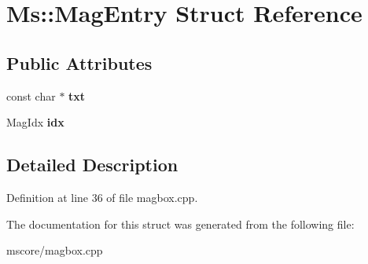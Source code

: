 \hypertarget{struct_ms_1_1_mag_entry}{}\section{Ms\+:\+:Mag\+Entry Struct Reference}
\label{struct_ms_1_1_mag_entry}
\subsection*{Public Attributes}
\begin{DoxyCompactItemize}
\item 
\mbox{\label{struct_ms_1_1_mag_entry_a7db5e2cd695adfa0621af0c840fbaaea}} 
const char $\ast$ {\bfseries txt}
\item 
\mbox{\label{struct_ms_1_1_mag_entry_a55c4d8b72feb78f20b3d7699d47878ba}} 
Mag\+Idx {\bfseries idx}
\end{DoxyCompactItemize}


\subsection{Detailed Description}


Definition at line 36 of file magbox.\+cpp.



The documentation for this struct was generated from the following file\+:\begin{DoxyCompactItemize}
\item 
mscore/magbox.\+cpp\end{DoxyCompactItemize}
